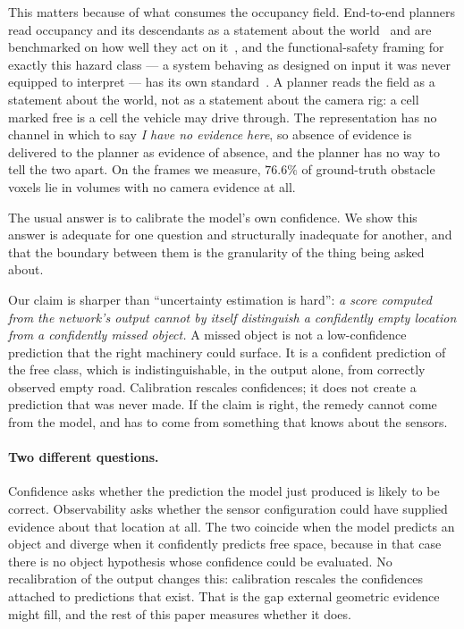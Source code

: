 \documentclass[10pt,twocolumn,letterpaper]{article}
\begin{document}
This matters because of what consumes the occupancy field. End-to-end
planners read occupancy and its descendants as a statement about the
world~\cite{hu2023uniad, chen2024vadv2} and are benchmarked on how well
they act on it~\cite{dauner2024navsim}, and the functional-safety framing
for exactly this hazard class --- a system behaving as designed on input it
was never equipped to interpret --- has its own
standard~\cite{iso21448}. A planner reads the field as a statement about
the world, not as a statement about the camera rig:
a cell marked free is a cell the vehicle may drive through. The
representation has no channel in which to say \emph{I have no evidence
here}, so absence of evidence is delivered to the planner as evidence of
absence, and the planner has no way to tell the two apart. On the frames we
measure, $76.6\%$ of ground-truth obstacle voxels lie in volumes with no
camera evidence at all.

The usual answer is to calibrate the model's own confidence. We show this
answer is adequate for one question and structurally inadequate for
another, and that the boundary between them is the granularity of the
thing being asked about.

Our claim is sharper than ``uncertainty estimation is hard'':
\emph{a score computed from the network's output cannot by itself
distinguish a confidently empty location from a confidently missed object.} A missed
object is not a low-confidence prediction that the right machinery could
surface. It is a confident prediction of the free class, which is
indistinguishable, in the output alone, from correctly observed empty road.
Calibration rescales confidences; it does not create a prediction that was
never made. If the claim is right, the remedy cannot come from the model,
and has to come from something that knows about the sensors.

\paragraph{Two different questions.} Confidence asks whether the
prediction the model just produced is likely to be correct. Observability
asks whether the sensor configuration could have supplied evidence about
that location at all. The two coincide when the model predicts an object
and diverge when it confidently predicts free space, because in that case
there is no object hypothesis whose confidence could be evaluated. No
recalibration of the output changes this: calibration rescales the
confidences attached to predictions that exist. That is the gap external
geometric evidence might fill, and the rest of this paper measures whether
it does.
\end{document}
